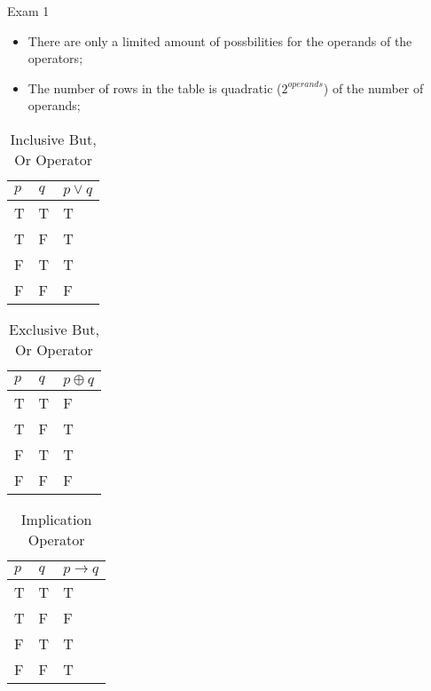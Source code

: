 \documentclass{note}
\begin{document}
\begin{note}{Exam 1}
        \begin{itemize}
            \item There are only a limited amount of possbilities for the operands of the operators;
            \item The number of rows in the table is quadratic ($ 2^{operands} $) of the number of operands;
        \end{itemize}

        \begin{longtabu} to \textwidth{ | X[l, 1] | X[l, 1] | X[l, 2] | }
            \caption{Inclusive But, Or Operator}\\
            \hline
            $ p $ & $ q $ & $ p \vee q $ \\ \hline \hline
            T & T & T \\ \hline
            T & F & T \\ \hline
            F & T & T \\ \hline
            F & F & F \\ \hline
        \end{longtabu}

        \begin{longtabu} to \textwidth{ | X[l, 1] | X[l, 1] | X[l, 2] | }
            \caption{Exclusive But, Or Operator}\\
            \hline
            $ p $ & $ q $ & $ p \oplus q $ \\ \hline \hline
            T & T & F \\ \hline
            T & F & T \\ \hline
            F & T & T \\ \hline
            F & F & F \\ \hline
        \end{longtabu}

        \begin{longtabu} to \textwidth{ | X[l, 1] | X[l, 1] | X[l, 2] | }
            \caption{Implication Operator}\\
            \hline
            $ p $ & $ q $ & $ p \to q $ \\ \hline \hline
            T & T & T \\ \hline
            T & F & F \\ \hline
            F & T & T \\ \hline
            F & F & T \\ \hline
        \end{longtabu}


\end{note}
\end{document}

